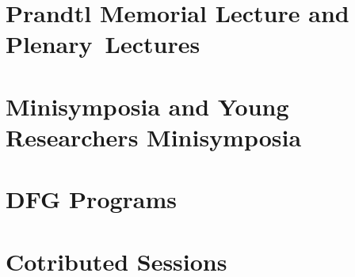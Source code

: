 \documentclass[colorlinks]{gamm-boa}
\begin{document}
\tableofcontents
\chapter{Prandtl Memorial Lecture and Plenary~Lectures}









\chapter{Minisymposia and Young Researchers Minisymposia}










\chapter{DFG Programs}






\chapter{Cotributed Sessions}




























\printindex
\end{document}
